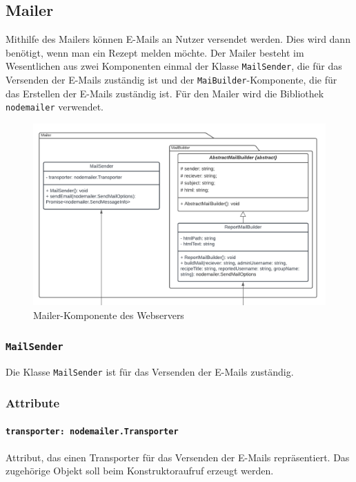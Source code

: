 \documentclass{entwurfsheft}
\begin{document}
\subsection{Mailer}
Mithilfe des Mailers können E-Mails an Nutzer versendet werden. Dies wird dann benötigt, wenn man ein Rezept melden möchte.
Der Mailer besteht im Wesentlichen aus zwei Komponenten einmal der Klasse \texttt{MailSender}, die für das Versenden der E-Mails zuständig ist und der \texttt{MaiBuilder}-Komponente, die für das Erstellen der E-Mails zuständig ist.
Für den Mailer wird die Bibliothek \texttt{nodemailer} verwendet.

\begin{figure}[htp]
    \centering
    \includegraphics[width = 1\textwidth]{images/webserver/mailer.pdf}
    \caption{Mailer-Komponente des Webservers}
    \label{fig:mailer}
\end{figure}

\subsubsection{\texttt{MailSender}}\label{sec:MailSender}
Die Klasse \texttt{MailSender} ist für das Versenden der E-Mails zuständig.

\subsubsection*{Attribute}
\paragraph{\texttt{transporter: nodemailer.Transporter}}
Attribut, das einen Transporter für das Versenden der E-Mails repräsentiert. Das zugehörige Objekt soll beim Konstruktoraufruf erzeugt werden.
\end{document}
